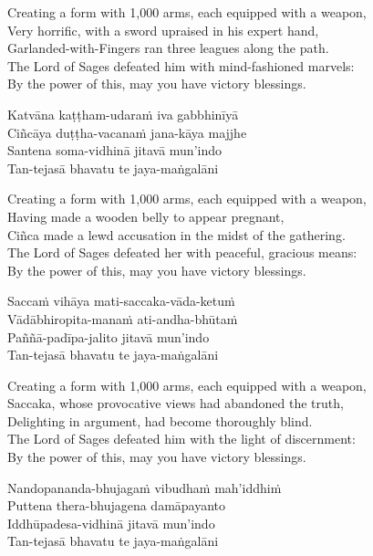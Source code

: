 \begin{english}
  Creating a form with 1,000 arms, each equipped with a weapon,\\
  Very horrific, with a sword upraised in his expert hand,\\
  Garlanded-with-Fingers ran three leagues along the path.\\
  The Lord of Sages defeated him with mind-fashioned marvels:\\
  By the power of this, may you have victory blessings.
\end{english}

Katvāna kaṭṭham-udaraṁ iva gabbhinīyā\\
Ciñcāya duṭṭha-vacanaṁ jana-kāya majjhe\\
Santena soma-vidhinā jitavā mun’indo\\
Tan-tejasā bhavatu te jaya-maṅgalāni

\begin{english}
  Creating a form with 1,000 arms, each equipped with a weapon,\\
  Having made a wooden belly to appear pregnant,\\
  Ciñca made a lewd accusation in the midst of the gathering.\\
  The Lord of Sages defeated her with peaceful, gracious means:\\
  By the power of this, may you have victory blessings.
\end{english}

Saccaṁ vihāya mati-saccaka-vāda-ketuṁ\\
Vādābhiropita-manaṁ ati-andha-bhūtaṁ\\
Paññā-padīpa-jalito jitavā mun’indo\\
Tan-tejasā bhavatu te jaya-maṅgalāni

\begin{english}
  Creating a form with 1,000 arms, each equipped with a weapon,\\
  Saccaka, whose provocative views had abandoned the truth,\\
  Delighting in argument, had become thoroughly blind.\\
  The Lord of Sages defeated him with the light of discernment:\\
  By the power of this, may you have victory blessings.
\end{english}

Nandopananda-bhujagaṁ vibudhaṁ mah’iddhiṁ\\
Puttena thera-bhujagena damāpayanto\\
Iddhūpadesa-vidhinā jitavā mun’indo\\
Tan-tejasā bhavatu te jaya-maṅgalāni

